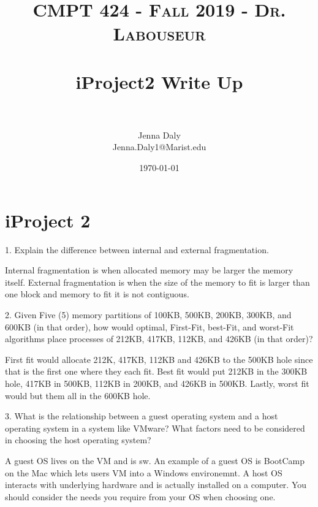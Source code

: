 \documentclass[letterpaper, 10pt,DIV=13]{scrartcl}
\title{	
   \normalfont \normalsize 
   \textsc{CMPT 424 - Fall 2019 - Dr. Labouseur} \\[10pt] %
   \horrule{0.5pt} \\[0.25cm] 	%
   \huge iProject2 Write Up  \\     	    %
   \horrule{0.5pt} \\[0.25cm] 	%
}
\author{Jenna Daly \\ \normalsize Jenna.Daly1@Marist.edu}
\date{\normalsize\today} 	%
\numberwithin{equation}{section} %
\numberwithin{figure}{section} %
\numberwithin{table}{section} %
\begin{document}
\maketitle %

\section{iProject 2}

1. Explain the difference between internal and external fragmentation.

Internal fragmentation is when allocated memory may be larger the memory itself. External fragmentation is when the size of the memory to fit is larger than one block and memory to fit it is not contiguous.

2. Given Five (5) memory partitions	of 100KB, 500KB, 200KB,	300KB, and 600KB	(in	that order), how would optimal,	First-Fit, best-Fit, and worst-Fit algorithms place processes of 212KB, 417KB,	112KB, and 426KB (in that order)?

First fit would allocate 212K, 417KB, 112KB and 426KB to the 500KB hole since that is the first one where they each fit. Best fit would put 212KB in the 300KB hole, 417KB in 500KB, 112KB in 200KB, and 426KB in 500KB. Lastly, worst fit would but them all in the 600KB hole.

3. What is the relationship	between	a guest	operating system and a host operating system in	a system like VMware? What factors need to be considered in choosing	the host operating system?

A guest OS lives on the VM and is sw. An example of a guest OS is BootCamp on the Mac which lets users VM into a Windows environemnt. A host OS interacts with underlying hardware and is actually installed on a computer. You should consider the needs you require from your OS when choosing one.
\end{document}
